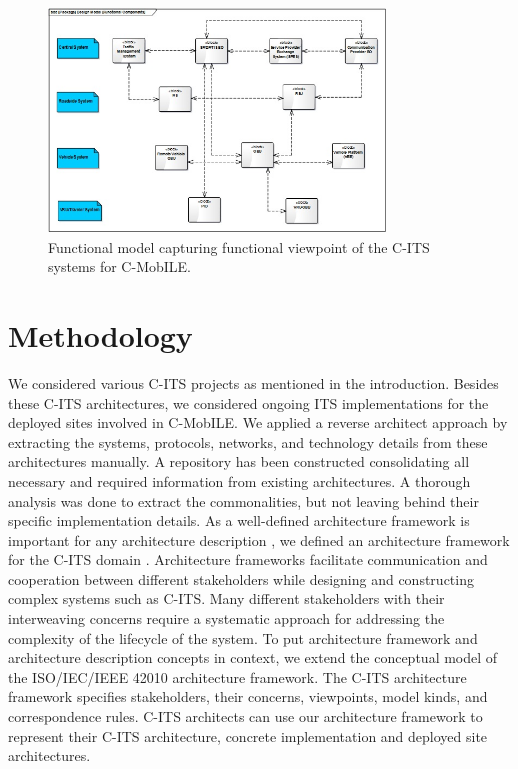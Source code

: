 \documentclass[conference]{IEEEtran}
\begin{document}
\begin{figure}[!t]
  \centering
  \includegraphics[width=0.8\textwidth]{functional_vp}
  \caption{Functional model capturing functional viewpoint of the C-ITS systems for C-MobILE.}
  \label{functional}
  \centering

\end{figure}


\section{Methodology}

We considered various C-ITS projects as mentioned in the introduction.
Besides these C-ITS architectures, we considered ongoing ITS implementations for the deployed sites involved in C-MobILE.
We applied a reverse architect approach by extracting the systems, protocols, networks, and technology details from these architectures manually.
A repository has been constructed consolidating all necessary and required information from existing architectures.
A thorough analysis was done to extract the commonalities, but not leaving behind their specific implementation details.
As a well-defined architecture framework is important for any architecture description \cite{archframework}, we defined an architecture framework for the C-ITS domain \cite{ITSCongress}.
Architecture frameworks facilitate communication and cooperation between different stakeholders while designing and constructing complex systems such as C-ITS.
Many different stakeholders with their interweaving concerns require a systematic approach for addressing the complexity of the lifecycle of the system.
To put architecture framework and architecture description concepts in context, we extend the conceptual model of the ISO/IEC/IEEE 42010\cite{iso42010} architecture framework.
The C-ITS architecture framework specifies stakeholders, their concerns, viewpoints, model kinds, and correspondence rules.
C-ITS architects can use our architecture framework to represent their C-ITS architecture, concrete implementation and deployed site architectures.
\end{document}
